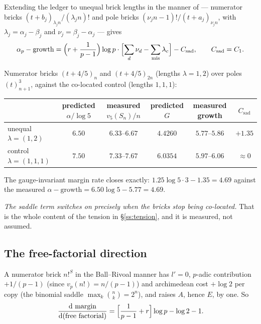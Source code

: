 Extending the ledger to unequal brick lengths in the manner of \cite[(2.4)]{Zudilin2004} ---
numerator bricks $(t+b_j)_{\lambda_jn}/(\lambda_jn)!$ and pole bricks
$(\nu_jn-1)!/(t+a_j)_{\nu_jn}$, with $\lambda_j=\alpha_j-\beta_j$ and $\nu_j=\beta_j-\alpha_j$ ---
gives
\begin{equation}\label{eq:unequal}
 \alpha_p-\mathrm{growth}
  =\Bigl(r+\frac1{p-1}\Bigr)\log p\cdot
   \Bigl[\sum_d\nu_d-\sum_{\mathrm{mis}}\lambda_c\Bigr]-C_{\mathrm{sad}},
 \qquad C_{\mathrm{sad}}=C_1 .
\end{equation}

\begin{finding}\label{find:saddle}
 Numerator bricks $(t+4/5)_n$ and
$(t+4/5)_{2n}$ (lengths $\lambda=1,2$) over poles $(t)_{n+1}^3$, against the co-located
control (lengths $1,1,1$):
\begin{center}
\tabsmall
\begin{tabular}{lccccc}
\toprule
 & predicted $\alpha/\log5$ & measured $v_5(S_n)/n$ & predicted $G$ & measured growth & $C_{\mathrm{sad}}$\\
\midrule
unequal $\lambda=(1,2)$ & $6.50$ & $6.33$--$6.67$ & $4.4260$ & $5.77$--$5.86$ & $+1.35$\\
control $\lambda=(1,1,1)$ & $7.50$ & $7.33$--$7.67$ & $6.0354$ & $5.97$--$6.06$ & $\approx0$\\
\bottomrule
\end{tabular}
\end{center}
The gauge-invariant margin rate closes exactly:
$1.25\log5\cdot3-1.35=4.69$ against the measured
$\alpha-\mathrm{growth}=6.50\log5-5.77=4.69$.
\end{finding}

\emph{The saddle term switches on precisely when the bricks stop being co-located.} That is
the whole content of the tension in \S\ref{ss:tension}, and it is measured, not assumed.

\subsection{The free-factorial direction}\label{ss:freefact}

A numerator brick $n!^S$ in the Ball--Rivoal manner \cite{BallRivoal2001} has $l'=0$,
$p$-adic contribution $+1/(p-1)$ (since $v_p(n!)=n/(p-1)$) and archimedean cost $+\log2$ per
copy (the binomial saddle $\max_k\binom nk=2^n$), and raises $A$, hence $E$, by one. So
\begin{equation}\label{eq:freefact}
 \frac{\mathrm{d}\,\operatorname{margin}}{\mathrm{d}(\text{free factorial})}=\Bigl[\frac1{p-1}+r\Bigr]\log p-\log2-1 .
\end{equation}

